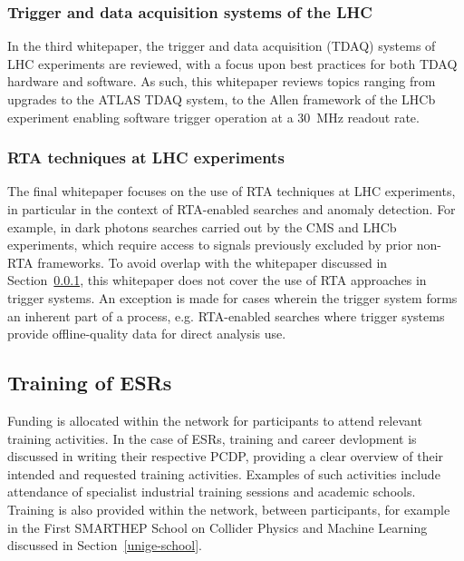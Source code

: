 \subsubsection{Trigger and data acquisition systems of the LHC}
\label{wp-TDAQ-at-LHC}
In the third whitepaper, the trigger and data acquisition (TDAQ) systems of LHC experiments are reviewed, with a focus upon best practices for both TDAQ hardware and software. As such, this whitepaper reviews topics ranging from upgrades to the ATLAS TDAQ system, to the Allen framework of the LHCb experiment enabling software trigger operation at a 30~MHz readout rate. \cite{ATLAS-TDAQ, LHCb-Allen}

\subsubsection{RTA techniques at LHC experiments}
\label{wp-RTA-at-LHC}
The final whitepaper focuses on the use of RTA techniques at LHC experiments, in particular in the context of RTA-enabled searches and anomaly detection. For example, in dark photons searches carried out by the CMS and LHCb experiments, which require access to signals previously excluded by prior non-RTA frameworks. \cite{CMS-dark-photon, LHCb-dark-photon} To avoid overlap with the whitepaper discussed in Section~\ref{wp-TDAQ-at-LHC}, this whitepaper does not cover the use of RTA approaches in trigger systems. An exception is made for cases wherein the trigger system forms an inherent part of a process, e.g. RTA-enabled searches where trigger systems provide offline-quality data for direct analysis use. 


\subsection{Training of ESRs}
\label{training}
Funding is allocated within the network for participants to attend relevant training activities. In the case of ESRs, training and career devlopment is discussed in writing their respective PCDP, providing a clear overview of their intended and requested training activities. Examples of such activities include attendance of specialist industrial training sessions and academic schools. Training is also provided within the network, between participants, for example in the First SMARTHEP School on Collider Physics and Machine Learning discussed in Section~\ref{unige-school}.

